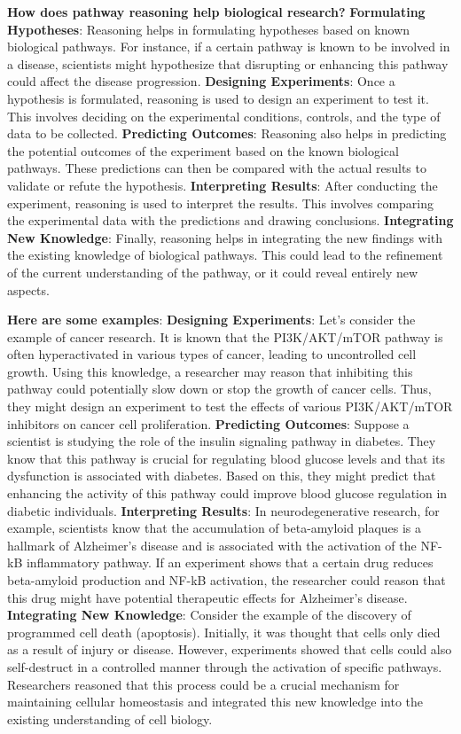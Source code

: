 \textbf{How does pathway reasoning help biological research?} \textbf{Formulating Hypotheses}: Reasoning helps in formulating hypotheses based on known biological pathways. For instance, if a certain pathway is known to be involved in a disease, scientists might hypothesize that disrupting or enhancing this pathway could affect the disease progression. \textbf{Designing Experiments}: Once a hypothesis is formulated, reasoning is used to design an experiment to test it. This involves deciding on the experimental conditions, controls, and the type of data to be collected. \textbf{Predicting Outcomes}: Reasoning also helps in predicting the potential outcomes of the experiment based on the known biological pathways. These predictions can then be compared with the actual results to validate or refute the hypothesis. \textbf{Interpreting Results}: After conducting the experiment, reasoning is used to interpret the results. This involves comparing the experimental data with the predictions and drawing conclusions. \textbf{Integrating New Knowledge}: Finally, reasoning helps in integrating the new findings with the existing knowledge of biological pathways. This could lead to the refinement of the current understanding of the pathway, or it could reveal entirely new aspects.

\textbf{Here are some examples}: \textbf{Designing Experiments}: Let's consider the example of cancer research. It is known that the PI3K/AKT/mTOR pathway is often hyperactivated in various types of cancer, leading to uncontrolled cell growth. Using this knowledge, a researcher may reason that inhibiting this pathway could potentially slow down or stop the growth of cancer cells. Thus, they might design an experiment to test the effects of various PI3K/AKT/mTOR inhibitors on cancer cell proliferation. \textbf{Predicting Outcomes}: Suppose a scientist is studying the role of the insulin signaling pathway in diabetes. They know that this pathway is crucial for regulating blood glucose levels and that its dysfunction is associated with diabetes. Based on this, they might predict that enhancing the activity of this pathway could improve blood glucose regulation in diabetic individuals.
\textbf{Interpreting Results}: In neurodegenerative research, for example, scientists know that the accumulation of beta-amyloid plaques is a hallmark of Alzheimer's disease and is associated with the activation of the NF-kB inflammatory pathway. If an experiment shows that a certain drug reduces beta-amyloid production and NF-kB activation, the researcher could reason that this drug might have potential therapeutic effects for Alzheimer's disease. \textbf{Integrating New Knowledge}: Consider the example of the discovery of programmed cell death (apoptosis). Initially, it was thought that cells only died as a result of injury or disease. However, experiments showed that cells could also self-destruct in a controlled manner through the activation of specific pathways. Researchers reasoned that this process could be a crucial mechanism for maintaining cellular homeostasis and integrated this new knowledge into the existing understanding of cell biology.

